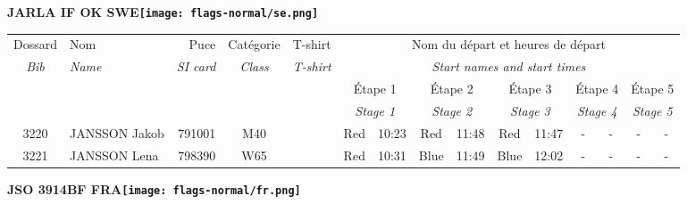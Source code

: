 \documentclass{report}
\begin{document}
\newpage
  \Huge \centering \bfseries JARLA IF OK  SWE\normalfont \footnotesize \sffamily \hfill \texttt{[image: flags-normal/se.png]} \newline 
  \begin{longtable}{|c|l|r|c|c|*{5}{cc|}}
    Dossard & Nom  & Puce    & Catégorie & T-shirt & \multicolumn{10}{c|}{Nom du départ et heures de départ} \\
    \itshape Bib     & \itshape Name & \itshape SI card & \itshape Class  & \itshape  T-shirt  & \multicolumn{10}{c|}{\itshape Start names and start times} \\
    \hline
    & & & & & \multicolumn{2}{c|}{Étape 1} & \multicolumn{2}{c|}{Étape 2} & \multicolumn{2}{c|}{Étape 3} & \multicolumn{2}{c|}{Étape 4} & \multicolumn{2}{c|}{Étape 5} \\
    & & & & & \multicolumn{2}{c|}{\itshape Stage 1} & \multicolumn{2}{c|}{\itshape Stage 2} & \multicolumn{2}{c|}{\itshape Stage 3} & \multicolumn{2}{c|}{\itshape Stage 4} & \multicolumn{2}{c|}{\itshape Stage 5} \\
    \hline
    3220 & JANSSON Jakob & 791001 & M40 &   & Red & 10:23 & Red & 11:48 & Red & 11:47 & - &  - & - &  -\\
    3221 & JANSSON Lena & 798390 & W65 &   & Red & 10:31 & Blue & 11:49 & Blue & 12:02 & - &  - & - &  -\\
  \end{longtable}
\newpage
  \Huge \centering \bfseries JSO 3914BF FRA\normalfont \footnotesize \sffamily \hfill \texttt{[image: flags-normal/fr.png]} \newline 
\end{document}
